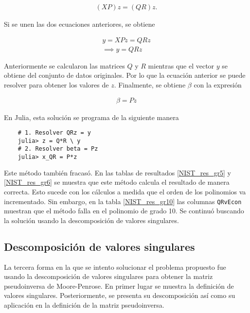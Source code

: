 \begin{equation*}
    \begin{aligned}
    (XP) z = (QR) z . 
    \end{aligned}
\end{equation*}

\noindent Si se unen las dos ecuaciones anteriores, se obtiene 

\begin{equation*}
    \begin{aligned}
    y = XP z = QR z \\
    \implies y = QRz
    \end{aligned}
\end{equation*}

\noindent Anteriormente se calcularon las matrices $Q$ y $R$ mientras que el vector $y$ se obtiene del conjunto de datos originales. Por lo que la ecuación anterior se puede resolver para obtener los valores de $z$. Finalmente, se obtiene $\beta$ con la expresión 

\begin{equation*}
    \begin{aligned}
    \beta = Pz
    \end{aligned}
\end{equation*}

\noindent En Julia, esta solución se programa de la siguiente manera
\begin{verbatim}
    # 1. Resolver QRz = y
    julia> z = Q*R \ y
    # 2. Resolver beta = Pz
    julia> x_QR = P*z
\end{verbatim}


Este método también fracasó. En las tablas de resultados \ref{NIST_res_gr5} y \ref{NIST_res_gr6} se muestra que este método calcula el resultado de manera correcta. Esto sucede con los cálculos a medida que el orden de los polinomios va incrementado. Sin embargo, en la tabla \ref{NIST_res_gr10} las columnas \texttt{QRvEcon} muestran que el método falla en el polinomio de grado 10. Se continuó buscando la solución usando la descomposición de valores singulares.

\subsection{Descomposición de valores singulares} \label{subsec_DVS}

La tercera forma en la que se intento solucionar el problema propuesto fue usando la descomposición de valores singulares para obtener la matriz pseudoinversa de Moore-Penrose. En primer lugar se muestra la definición de valores singulares. Posteriormente, se presenta su descomposición así como su aplicación en la definición de la matriz pseudoinversa. 

